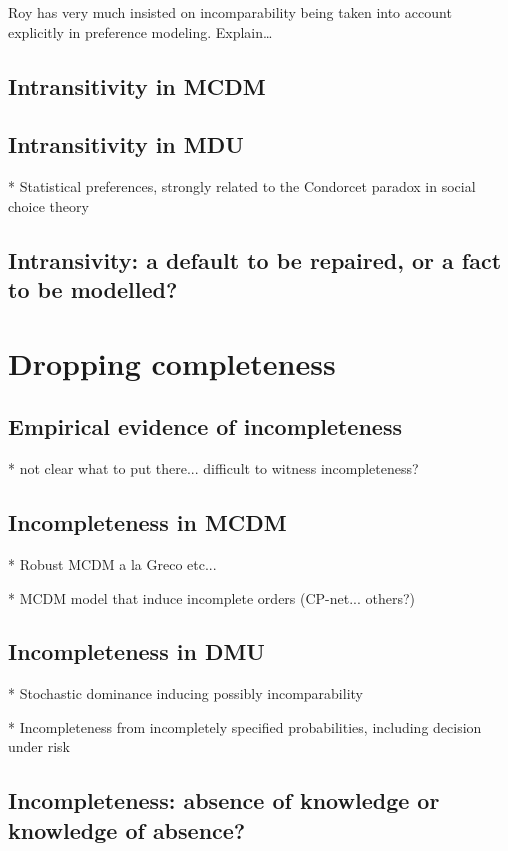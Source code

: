 \documentclass[french, english]{llncs}
\begin{document}
Roy has very much insisted on incomparability being taken into account explicitly in preference modeling. Explain…

\subsection{Intransitivity in MCDM}

\subsection{Intransitivity in MDU}

* Statistical preferences, strongly related to the Condorcet paradox in social choice theory

\subsection{Intransivity: a default to be repaired, or a fact to be modelled?}

\section{Dropping completeness}

\subsection{Empirical evidence of incompleteness}

* not clear what to put there... difficult to witness incompleteness? 

\subsection{Incompleteness in MCDM}

* Robust MCDM a la Greco etc...

* MCDM model that induce incomplete orders (CP-net... others?)

\subsection{Incompleteness in DMU}

* Stochastic dominance inducing possibly incomparability

* Incompleteness from incompletely specified probabilities, including decision under risk

\subsection{Incompleteness: absence of knowledge or knowledge of absence?}
\end{document}

